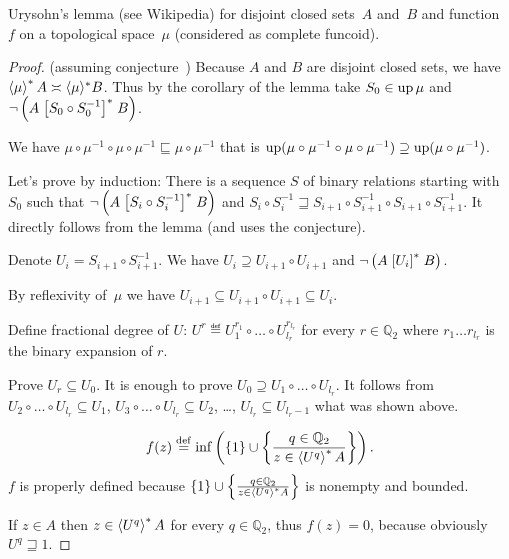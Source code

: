 \begin{thm}
Urysohn's lemma (see Wikipedia) for disjoint closed sets~$A$ and~$B$ and function~$f$ on a topological space~$\mu$
(considered as complete funcoid). 
\end{thm}

\begin{proof}
(assuming conjecture~) Because $A$ and $B$ are disjoint closed sets, we
have $\left\langle \mu\right\rangle ^{\ast} A \asymp \langle \mu
\rangle^{\ast} B$. Thus by the corollary of the lemma take $S_0 \in \operatorname{up}
\mu$ and $\neg \left( A \mathrel{\left[S_0 \circ S_0^{- 1}\right]^{\ast}} B
\right)$.

We have $\mu \circ \mu^{- 1} \circ \mu \circ \mu^{- 1}
\sqsubseteq \mu \circ \mu^{- 1}$ that is $\operatorname{up} (\mu
\circ \mu^{- 1} \circ \mu \circ \mu^{- 1}) \supseteq
\operatorname{up} (\mu \circ \mu^{- 1})$.

Let's prove by induction: There is a sequence $S$ of binary relations starting
with $S_0$ such that $\neg \left( A \mathrel{\left[S_i \circ S_i^{- 1}\right]^{\ast}} B
\right)$ and $S_i \circ S_i^{- 1} \sqsupseteq S_{i + 1} \circ S_{i + 1}^{- 1}
\circ S_{i + 1} \circ S_{i + 1}^{- 1}$. It directly follows from the lemma
(and uses the conjecture).

Denote $U_i = S_{i + 1} \circ S_{i + 1}^{- 1}$. We have $U_i \supseteq U_{i +
1} \circ U_{i + 1}$ and $\neg \left( A \mathrel{\left[U_i\right]^{\ast}} B \right)$.

By reflexivity of~$\mu$ we have $U_{i+1} \subseteq U_{i+1}\circ U_{i+1} \subseteq U_i$.

Define fractional degree of $U$: $U^r \eqdef U_1^{r_1} \circ
\ldots \circ U_{l_r}^{r_{l_r}}$ for every $r \in \mathbb{Q}_2$ where $r_1
\ldots r_{l_r}$ is the binary expansion of $r$.

Prove $U_r\subseteq U_0$. It is enough to prove
$U_0 \supseteq U_1 \circ \ldots \circ U_{l_r}$. It follows from $U_2 \circ
\ldots \circ U_{l_r} \subseteq U_1$, $U_3 \circ \ldots \circ U_{l_r} \subseteq
U_2$, \dots, $U_{l_r} \subseteq U_{l_r - 1}$ what was shown above.

\[ f (z) \overset{\mathrm{def}}{=} \inf \left( \{ 1 \} \cup \left\{ \frac{ q \in
   \mathbb{Q}_2 }{ z \in \left\langle U^q\right\rangle ^{\ast}
   A }\right\} \right). \]
$f$ is properly defined because $\{ 1 \} \cup \left\{ \frac{ q \in \mathbb{Q}_2
}{ z \in \left\langle U^q\right\rangle ^{\ast} A }\right\}$ is
nonempty and bounded.

If $z \in A$ then $z \in \left\langle U^q\right\rangle ^{\ast} A$ for every $q \in
\mathbb{Q}_2$, thus $f (z) = 0$, because obviously $U^q \sqsupseteq 1$.


\end{proof}
